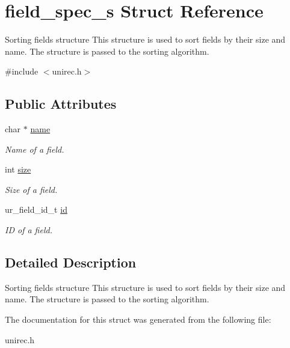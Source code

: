 \hypertarget{structfield__spec__s}{}\section{field\+\_\+spec\+\_\+s Struct Reference}
\label{structfield__spec__s}


Sorting fields structure This structure is used to sort fields by their size and name. The structure is passed to the sorting algorithm.  




{\ttfamily \#include $<$unirec.\+h$>$}

\subsection*{Public Attributes}
\begin{DoxyCompactItemize}
\item 
char $\ast$ \hyperlink{structfield__spec__s_ab90cdc3e4732d00c8400399078358901}{name}\hypertarget{structfield__spec__s_ab90cdc3e4732d00c8400399078358901}{}\label{structfield__spec__s_ab90cdc3e4732d00c8400399078358901}

\begin{DoxyCompactList}\small\item\em Name of a field. \end{DoxyCompactList}\item 
int \hyperlink{structfield__spec__s_a3ddf14e065d496b15c9890be85bfc186}{size}\hypertarget{structfield__spec__s_a3ddf14e065d496b15c9890be85bfc186}{}\label{structfield__spec__s_a3ddf14e065d496b15c9890be85bfc186}

\begin{DoxyCompactList}\small\item\em Size of a field. \end{DoxyCompactList}\item 
ur\+\_\+field\+\_\+id\+\_\+t \hyperlink{structfield__spec__s_a059ead63b6e242aef90c2ba0d795c841}{id}\hypertarget{structfield__spec__s_a059ead63b6e242aef90c2ba0d795c841}{}\label{structfield__spec__s_a059ead63b6e242aef90c2ba0d795c841}

\begin{DoxyCompactList}\small\item\em ID of a field. \end{DoxyCompactList}\end{DoxyCompactItemize}


\subsection{Detailed Description}
Sorting fields structure This structure is used to sort fields by their size and name. The structure is passed to the sorting algorithm. 

The documentation for this struct was generated from the following file\+:\begin{DoxyCompactItemize}
\item 
unirec.\+h\end{DoxyCompactItemize}
